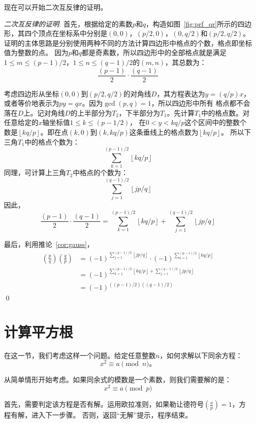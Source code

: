  现在可以开始二次互反律的证明。
  \begin{proof}[二次互反律的证明]
  首先，根据给定的素数$p$和$q$，构造如图~\ref{fig:prf_qr}所示的四边形，其四个顶点在坐标系中分别是$(0, 0)$，$(p/2, 0)$，$(0, q/2)$和$(p/2, q/2)$。
  证明的主体思路是分别使用两种不同的方法计算四边形中格点的个数，格点即坐标值为整数的点。
  因为$p$和$q$都是奇素数，所以四边形中的全部格点就是满足$1\leq m \leq (p-1)/2$，$1 \leq n \leq (q-1)/2$的$(m,n)$，其总数为：
  \[\frac{(p-1)}{2}\cdot \frac{(q-1)}{2}\]
  
  考虑四边形从坐标$(0,0)$到$(p/2, q/2)$的对角线$D$，其方程表达为$y = (q/p)x$，或者等价地表示为$py = qx$。因为$\gcd(p,q)=1$，所以四边形中所有
  格点都不会落在$D$上。记对角线$D$的上半部分为$T_2$，下半部分为$T_1$。先计算$T_1$中的格点数。对任意给定的$x$轴坐标值$1\leq k \leq (p-1/2)$，
  在$0 < y < kq/p$这个区间中的整数个数是$\left \lfloor kq/p \right\rfloor$。即在点$(k,0)$到$(k, kq/p)$这条垂线上的格点数为$\left \lfloor kq/p \right\rfloor$。
  所以下三角$T_1$中的格点个数为：
  \[ \sum_{k = 1}^{(p - 1)/2} \left \lfloor kq/p \right\rfloor\]
  同理，可计算上三角$T_2$中格点的个数为：
  \[ \sum_{j = 1}^{(q - 1)/2} \left \lfloor jp/q \right\rfloor\]
  因此，
  \[\frac{(p-1)}{2}\cdot \frac{(q-1)}{2}= \sum_{k = 1}^{(p - 1)/2} \left \lfloor kq/p \right\rfloor + \sum_{j = 1}^{(q - 1)/2} \left \lfloor jp/q \right\rfloor\]
  
  最后，利用推论~\ref{cor:gauss}，
  \begin{align*}
  \left(\frac{p}{q}\right) \left(\frac{q}{p} \right) 
  &= (-1)^{\sum_{j = 1}^{(q - 1)/2} \left \lfloor jp/q \right\rfloor} \cdot (-1)^{\sum_{k = 1}^{(p - 1)/2} \left \lfloor kq/p \right\rfloor }\\  
  &= (-1)^{\sum_{k = 1}^{(p - 1)/2} \left \lfloor kq/p \right\rfloor + \sum_{j = 1}^{(q - 1)/2} \left \lfloor jp/q \right\rfloor}\\
  &= (-1)^{((p-1)/2)((q-1)/2)}
  \end{align*}
 \qed
  \end{proof}
 \section{计算平方根}
 \label{sec:sqrt}
 在这一节，我们考虑这样一个问题。给定任意整数$n$，如何求解以下同余方程：
 \[x^ 2 \equiv a \pmod{n} \text{。}\]
 
 从简单情形开始考虑。如果同余式的模数是一个素数，则我们需要解的是：
 \[ x^2 \equiv a \pmod{p}\]
 
 
首先，需要判定该方程是否有解。运用欧拉准则，如果勒让德符号$\left( \frac{a}{p} \right) = 1$，方程有解，进入下一步骤。
否则，返回“无解”提示，程序结束。

